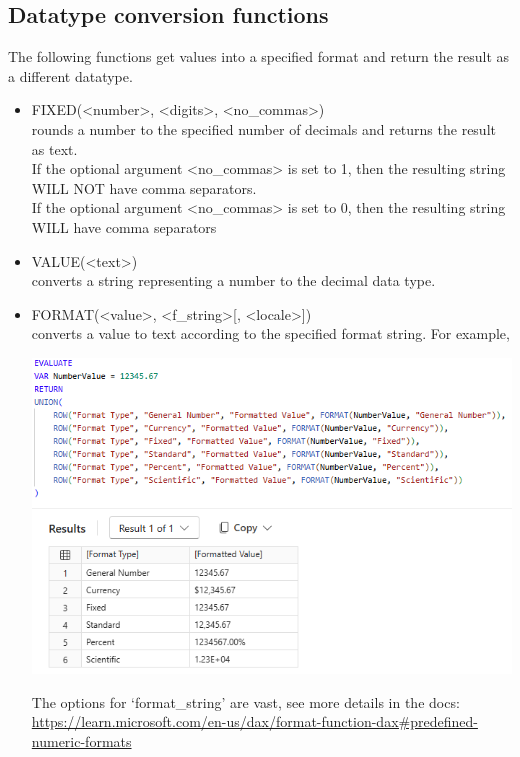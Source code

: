 \documentclass[10pt, openany, twocolumn]{book}
\begin{document}
\subsection*{Datatype conversion functions}

The following functions get values into a specified format and return the result as a different datatype. 
\begin{itemize}
    \item FIXED(<number>, <digits>, <no\_commas>)\\ rounds a number to the specified number of decimals and returns the result as text. \\
    If the optional argument <no\_commas> is set to 1, then the resulting string WILL NOT have comma separators. \\
    If the optional argument <no\_commas> is set to 0, then the resulting string WILL have comma separators
    \item VALUE(<text>) \\ converts a string representing a number to the decimal data type.
    \item FORMAT(<value>, <f\_string>[, <locale>])\\ converts a value to text according to the specified format string. For example,     
    \begin{center}
        \includegraphics[width = 0.95\columnwidth]{images/FORMAT.png}
    \end{center}  
    
    \begin{tcolorbox}[colback=yellow!2!white, colframe=yellow!60!gray]    
    The options for `format\_string' are vast, see more details in the docs: \href{https://learn.microsoft.com/en-us/dax/format-function-dax#predefined-numeric-formats}{https://learn.microsoft.com/en-us/dax/format-function-dax\#predefined-numeric-formats}
    \end{tcolorbox}
\end{itemize}
\end{document}

